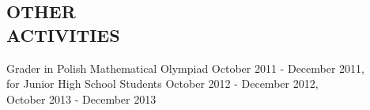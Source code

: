 \documentclass[margin, 10pt]{res} %
\begin{document}
\begin{resume}

\section{ OTHER \\ ACTIVITIES } 

Grader in Polish Mathematical Olympiad \hfill October 2011 - December 2011, \\
for Junior High School Students \hfill October 2012 - December 2012, \\
\hspace*{0pt} \hfill October 2013 - December 2013





\end{resume}
\end{document}
